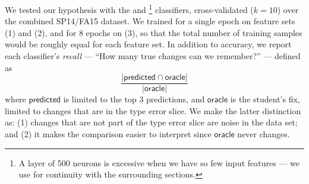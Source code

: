 
We tested our hypothesis with the \linear and
%
\hiddenFH\footnote{A layer of 500 neurons is excessive when we have so few
  input features --- we use \hiddenFH for continuity with the
  surrounding sections.}
%
classifiers, cross-validated ($k=10$) over the combined SP14/FA15
dataset.
%
We trained for a single epoch on feature sets (1) and (2), and for 8
epochs on (3), so that the total number of training samples would be
roughly equal for each feature set.
%
\lstDeleteShortInline{|} %
In addition to accuracy, we report each
classifier's \emph{recall} --- \ie ``How many true changes can we
remember?'' --- defined as
$$
\frac{|\mathsf{predicted} \cap \mathsf{oracle}|}
     {|\mathsf{oracle}|}
$$
where $\mathsf{predicted}$ is limited to the top 3 predictions, and
$\mathsf{oracle}$ is the student's fix, limited to changes that are in
the type error slice.
%
We make the latter distinction as:
%
(1) changes that are not part of the type error slice are noise in the
data set; and
%
(2) it makes the comparison easier to interpret since $\mathsf{oracle}$
never changes.
\lstMakeShortInline{|}
%


